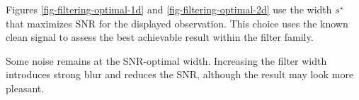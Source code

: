 Figures \ref{fig-filtering-optimal-1d} and \ref{fig-filtering-optimal-2d} use the width $s^\star$ that maximizes SNR for the displayed observation. This choice uses the known clean signal to assess the best achievable result within the filter family.



Some noise remains at the SNR-optimal width. Increasing the filter width introduces strong blur and reduces the SNR, although the result may look more pleasant.


                          